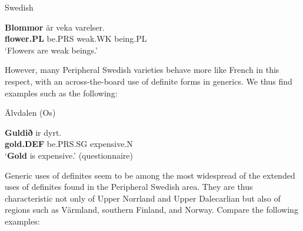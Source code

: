 Swedish



 \ea\label{}
\gll \textbf{Blommor} är  veka  varelser.\\


\textbf{flower.PL} be.PRS  weak.WK  being.PL\\

\glt ‘Flowers are weak beings.’

\z

However, many Peripheral Swedish varieties behave more like French in this respect, with an across-the-board use of definite forms in generics. We thus find examples such as the following:


\item 

Älvdalen (Os)



 \ea\label{}
\gll \textbf{Guld}\textbf{ið} ir  dyrt.  \\


\textbf{gold.DEF} be.PRS.SG  expensive.N  \\

\glt ‘\textbf{Gold} is expensive.’ (questionnaire)

\z

Generic uses of definites seem to be among the most widespread of the extended uses of definites found in the Peripheral Swedish area. They are thus characteristic not only of Upper Norrland and Upper Dalecarlian but also of regions such as Värmland, southern Finland, and Norway. Compare the following examples:


\item 

